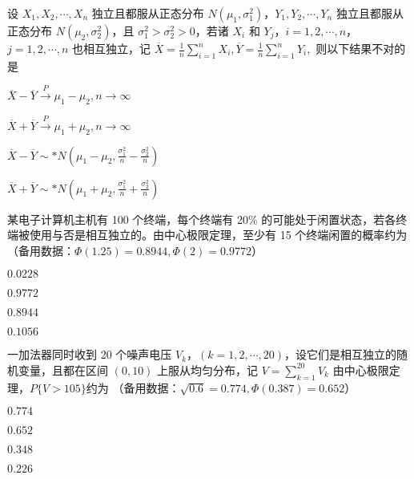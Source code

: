 \documentclass{exam-zh}
\begin{document}
\begin{question}
  设 $X_1, X_2, \cdots, X_n$ 独立且都服从正态分布 $N(\mu_1, \sigma_1^2)$，$Y_1, Y_2, \cdots, Y_n$ 独立且都服从正态分布 $N(\mu_2, \sigma_2^2)$，且 $\sigma_1^2 > \sigma_2^2 > 0$，若诸 $X_i$ 和 $Y_j$，$i = 1, 2, \cdots, n$，$j = 1, 2, \cdots, n$ 也相互独立，记
  $\overline{X} = \frac{1}{n} \sum_{i=1}^n X_i, \overline{Y} = \frac{1}{n} \sum_{i=1}^n Y_i,$
  则以下结果不对的是 \paren[C]

  \begin{choices}
    \item 
    $\overline{X} - \overline{Y} \xrightarrow{P} \mu_1 - \mu_2, n \to \infty$
    
    \item 
    $\overline{X} + \overline{Y} \xrightarrow{P} \mu_1 + \mu_2, n \to \infty$
    
    \item 
    $\overline{X} - \overline{Y} \sim* N \left( \mu_1 - \mu_2, \frac{\sigma_1^2}{n} - \frac{\sigma_2^2}{n} \right)$
    
    \item 
    $\overline{X} + \overline{Y} \sim* N \left( \mu_1 + \mu_2, \frac{\sigma_1^2}{n} + \frac{\sigma_2^2}{n} \right)$
  \end{choices}
\end{question}

\begin{question}
  某电子计算机主机有 100 个终端，每个终端有 20\% 的可能处于闲置状态，若各终端被使用与否是相互独立的。由中心极限定理，至少有 15 个终端闲置的概率约为 
  （备用数据：$\Phi(1.25) = 0.8944, \Phi(2) = 0.9772$）
  \paren[C]

  \begin{choices}
    \item $0.0228$
    \item $0.9772$
    \item $0.8944$
    \item $0.1056$
  \end{choices}
\end{question}

\begin{question}
  一加法器同时收到 20 个噪声电压 $V_k$，$(k=1,2,\cdots,20)$，设它们是相互独立的随机变量，且都在区间 $(0,10)$ 上服从均匀分布，记
  $V = \sum_{k=1}^{20} V_k$
  由中心极限定理，$P\{V > 105\} $约为
  （备用数据：$\sqrt{0.6} = 0.774, \Phi(0.387) = 0.652$）
  \paren[C]

  \begin{choices}
    \item $0.774$
    \item $0.652$
    \item $0.348$
    \item $0.226$
  \end{choices}
\end{question}
\end{document}

